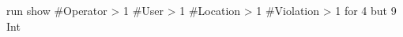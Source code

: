 \begin{alloy}
run show {
    #Operator > 1
    #User > 1
    #Location > 1
    #Violation > 1
} for 4 but 9 Int
\end{alloy}